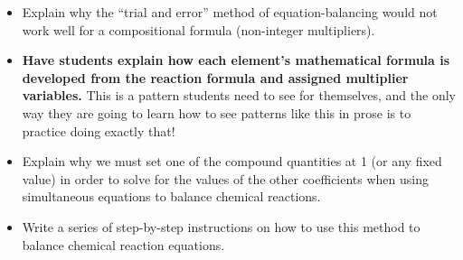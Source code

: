 \begin{itemize}
\item{} Explain why the ``trial and error'' method of equation-balancing would not work well for a compositional formula (non-integer multipliers).
\item{} {\bf Have students explain how each element's mathematical formula is developed from the reaction formula and assigned multiplier variables.}  This is a pattern students need to see for themselves, and the only way they are going to learn how to see patterns like this in prose is to practice doing exactly that!
\item{} Explain why we must set one of the compound quantities at 1 (or any fixed value) in order to solve for the values of the other coefficients when using simultaneous equations to balance chemical reactions.
\item{} Write a series of step-by-step instructions on how to use this method to balance chemical reaction equations.
\end{itemize}




